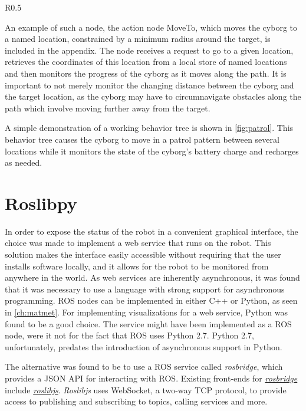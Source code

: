\documentclass[\rootfolder/main.tex]{subfiles}
\begin{document}
\begin{wrapfigure}{R}{0.5\columnwidth}
    \caption{Behavior tree that checks battery state, and charges if necessary, while patrolling.\label{fig:patrol}}
\end{wrapfigure}

An example of such a node, the action node MoveTo, which moves the cyborg to a named location, constrained by a minimum radius around the target, is included in the appendix.
The node receives a request to go to a given location, retrieves the coordinates of this location from a local store of named locations and then monitors the progress of the cyborg as it moves along the path.
It is important to not merely monitor the changing distance between the cyborg and the target location, as the cyborg may have to circumnavigate obstacles along the path which involve moving further away from the target.

A simple demonstration of a working behavior tree is shown in \cref{fig:patrol}.
This behavior tree causes the cyborg to move in a patrol pattern between several locations while it monitors the state of the cyborg's battery charge and recharges as needed.

\section{Roslibpy}

In order to expose the status of the robot in a convenient graphical interface, the choice was made to implement a web service that runs on the robot.
This solution makes the interface easily accessible without requiring that the user installs software locally, and it allows for the robot to be monitored from anywhere in the world.
As web services are inherently asynchronous, it was found that it was necessary to use a language with strong support for asynchronous programming.
ROS nodes can be implemented in either C++ or Python, as seen in \cref{ch:matmet}.
For implementing visualizations for a web service, Python was found to be a good choice.
The service might have been implemented as a ROS node, were it not for the fact that ROS uses Python 2.7.
Python 2.7, unfortunately, predates the introduction of asynchronous support in Python.

The alternative was found to be to use a ROS service called \emph{rosbridge}, which provides a JSON API for interacting with ROS.
Existing front-ends for \href{http://wiki.ros.org/rosbridge_suite}{\emph{rosbridge}} include \href{http://wiki.ros.org/roslibjs}{\emph{roslibjs}}.
\emph{Roslibjs} uses WebSocket, a two-way TCP protocol, to provide access to publishing and subscribing to topics, calling services and more.
\end{document}
